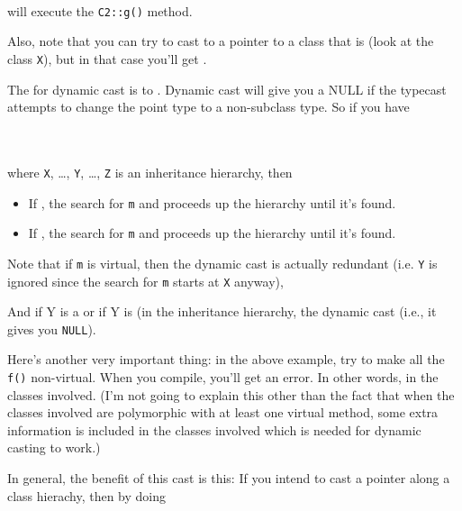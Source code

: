 \begin{consolethree}[escapeinside=||]
\\

will execute the \texttt{C2::g()} method.

Also, note that you can try to cast to a pointer to a class that is  (look at the class \texttt{X}), but in that case you'll get \texttt{}.

The  for dynamic cast is to . Dynamic cast will give you a NULL if the typecast attempts to change the point type to a non-subclass type. So if you have

\\
\\

where \texttt{X}, \ldots, \texttt{Y}, \ldots, \texttt{Z} is an inheritance hierarchy, then

\begin{itemize}
\item
  If , the search for \texttt{m}  and proceeds up the hierarchy until it's found.
\item
  If , the search for \texttt{m}  and proceeds up the hierarchy until it's found.
\end{itemize}

Note that if \texttt{m} is virtual, then the dynamic cast is actually redundant (i.e. \texttt{Y} is ignored since the search for \texttt{m} starts
at \texttt{X} anyway),

And if Y is a  or if Y is  (in the inheritance hierarchy, the dynamic cast  (i.e., it gives you \texttt{NULL}).

Here's another very important thing: in the above example, try to make all the \texttt{f()} non-virtual. When you compile, you'll get an error. In other words,  in the classes involved. (I'm not going to explain this other than the fact that when the classes involved are polymorphic with at least one virtual method, some extra information is included in the classes involved which is needed for dynamic casting to work.)

In general, the benefit of this cast is this: If you intend to cast a
pointer along a class hierachy, then by doing


\end{consolethree}

